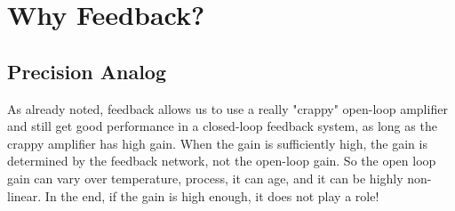 \section{Why Feedback?}
\subsection{Precision Analog}
As already noted, feedback allows us to use a really "crappy" open-loop amplifier and still get good performance in a closed-loop feedback system, as long as the crappy amplifier has high gain.  When the gain is sufficiently high, the gain is determined by the feedback network, not the open-loop gain.  So the open loop gain can vary over temperature, process, it can age, and it can be highly non-linear.  In the end, if the gain is high enough, it does not play a role!

